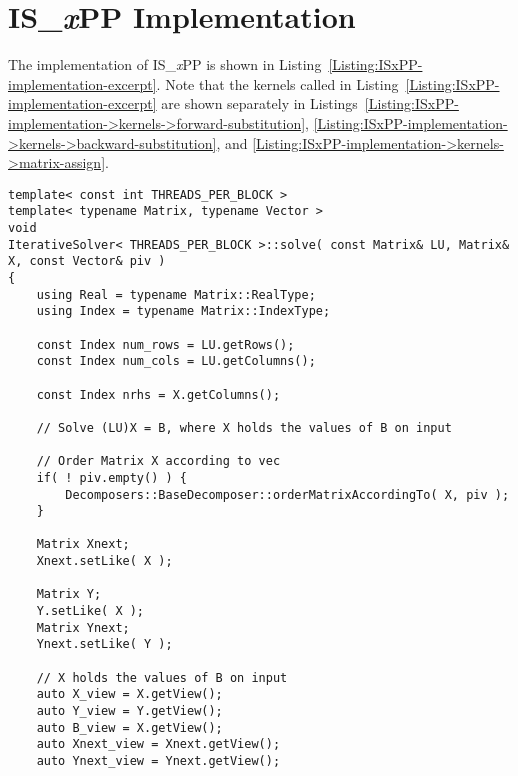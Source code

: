 \chapter{IS\_\textit{x}PP Implementation}\label{Appendix:ISxPP-implementation}
The implementation of IS\_\textit{x}PP is shown in Listing~\ref{Listing:ISxPP-implementation-excerpt}.
Note that the kernels called in Listing~\ref{Listing:ISxPP-implementation-excerpt} are shown separately in Listings~\ref{Listing:ISxPP-implementation->kernels->forward-substitution}, \ref{Listing:ISxPP-implementation->kernels->backward-substitution}, and \ref{Listing:ISxPP-implementation->kernels->matrix-assign}.

\begin{lstlisting}[caption={Excerpt from the implementation of IS\_\textit{x}PP.
The code has been slightly modified for brevity, for example, the checks for appropriate sizing of matrices and vectors have been removed.
Note that the CUDA thread blocks used in the implementation are larger in the 1st dimension.
Threads adjacent in the 1st dimension are assigned to neighboring elements in the same column since the matrices are stored in column-major order on the GPU.
In other words, to mitigate misaligned global memory access, the 1st dimension of threads is used to access elements in a single column and the 2nd dimension is used to differentiate between right-hand sides.},label={Listing:ISxPP-implementation-excerpt},escapechar=@]
template< const int THREADS_PER_BLOCK >
template< typename Matrix, typename Vector >
void
IterativeSolver< THREADS_PER_BLOCK >::solve( const Matrix& LU, Matrix& X, const Vector& piv )
{
	using Real = typename Matrix::RealType;
	using Index = typename Matrix::IndexType;
	
	const Index num_rows = LU.getRows();
	const Index num_cols = LU.getColumns();
	
	const Index nrhs = X.getColumns();
	
	// Solve (LU)X = B, where X holds the values of B on input
	
	// Order Matrix X according to vec
	if( ! piv.empty() ) {
		Decomposers::BaseDecomposer::orderMatrixAccordingTo( X, piv );
	}
	
	Matrix Xnext;
	Xnext.setLike( X );
	
	Matrix Y;
	Y.setLike( X );
	Matrix Ynext;
	Ynext.setLike( Y );
	
	// X holds the values of B on input
	auto X_view = X.getView();
	auto Y_view = Y.getView();
	auto B_view = X.getView();
	auto Xnext_view = Xnext.getView();
	auto Ynext_view = Ynext.getView();
	

\end{lstlisting}
